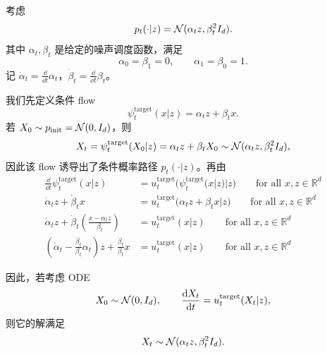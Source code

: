 \begin{example}
考虑
\begin{equation}
p_t(\cdot|z)=\mathcal{N}(\alpha_t z,\beta_t^2 I_d).
\end{equation}
其中 $\alpha_t,\beta_t$ 是给定的噪声调度函数，满足
\begin{equation}
\alpha_0=\beta_1=0,\qquad \alpha_1=\beta_0=1.
\end{equation}
记 $\dot{\alpha}_t=\frac{\dd}{\dd t}\alpha_t$，$\dot{\beta}_t=\frac{\dd}{\dd t}\beta_t$。

我们先定义条件 flow
\begin{equation}
\psi_t^{\mathrm{target}}(x|z)=\alpha_t z+\beta_t x.
\end{equation}
若 $X_0\sim p_{\mathrm{init}}=\mathcal{N}(0,I_d)$，则
\begin{equation}
X_t=\psi_t^{\mathrm{target}}(X_0|z)=\alpha_t z+\beta_t X_0
\sim
\mathcal{N}(\alpha_t z,\beta_t^2 I_d),
\end{equation}
\noindent
因此该 flow 诱导出了条件概率路径 $p_t(\cdot|z)$。再由
\begin{equation}
\begin{aligned}
\frac{\dd}{\dd t}\psi_t^{\mathrm{target}}(x|z)
&=
u_t^{\mathrm{target}}
\bigl(
\psi_t^{\mathrm{target}}(x|z)| z
\bigr)
\qquad
\text{for all } x,z \in \mathbb{R}^d \\
\dot{\alpha}_t z + \dot{\beta}_t x
&=
u_t^{\mathrm{target}}
\bigl(
\alpha_t z + \beta_t x | z
\bigr)
\qquad
\text{for all } x,z \in \mathbb{R}^d \\
\dot{\alpha}_t z
+
\dot{\beta}_t
\left(
\frac{x - \alpha_t z}{\beta_t}
\right)
&=
u_t^{\mathrm{target}}(x | z)
\qquad
\text{for all } x,z \in \mathbb{R}^d \\
\left(
\dot{\alpha}_t
-
\frac{\dot{\beta}_t}{\beta_t}\alpha_t
\right) z
+
\frac{\dot{\beta}_t}{\beta_t}x
&=
u_t^{\mathrm{target}}(x | z)
\qquad
\text{for all } x,z \in \mathbb{R}^d
\end{aligned}
\end{equation}

因此，若考虑 ODE
\begin{equation}
X_0\sim \mathcal{N}(0,I_d),
\qquad
\frac{\mathrm{d} X_t}{\mathrm{d} t}=u_t^{\mathrm{target}}(X_t|z),
\end{equation}
则它的解满足
\begin{equation}
X_t\sim \mathcal{N}(\alpha_t z,\beta_t^2 I_d).
\end{equation}
\end{example}

